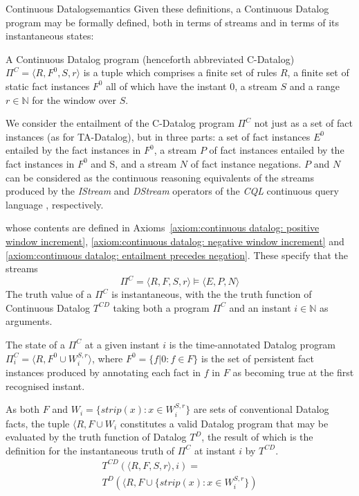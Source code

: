 \begin{nestedsection}{Continuous Datalog}{semantics}
Given these definitions, a Continuous Datalog program may be formally
defined, both in terms of streams and in terms of its instantaneous
states:

\begin{definition}

A Continuous Datalog program (henceforth abbreviated C-Datalog)
$\Pi^C = \langle R, F^0, S, r \rangle$ is a tuple which comprises a
finite set of rules $R$, a finite set of static fact instances $F^0$
all of which have the instant $0$, a stream $S$ and a range ${r \in
\mathbb{N}}$ for the window over $S$.


We consider the entailment of the C-Datalog program $\Pi^C$ not just
as a set of fact instances (as for TA-Datalog), but in three parts: a
set of fact instances $E^0$ entailed by the fact instances in $F^0$, a
stream $P$ of fact instances entailed by the fact instances in $F^0$
and S, and a stream $N$ of fact instance negations. $P$ and $N$ can be
considered as the continuous reasoning equivalents of the streams
produced by the \emph{IStream} and \emph{DStream} operators of the
\emph{CQL} continuous query language \citep{CQL}, respectively.



whose contents
are defined in 
Axioms~\ref{axiom:continuous datalog: positive window increment}, 
\ref{axiom:continuous datalog: negative window increment} and
\ref{axiom:continuous datalog: entailment precedes negation}. 
These specify that the streams 
\[ \Pi^C = \langle R, F, S, r \rangle \vDash \langle E, P, N \rangle \]
The truth value of a $\Pi^C$ is instantaneous, with the the truth
function of Continuous Datalog $T^{CD}$ taking both a program ${\Pi^C}$
and an instant ${i \in \mathbb{N}}$ as arguments.
\end{definition}

\begin{definition}[State of a $\Pi^C$]\label{def:continuous datalog: CDPt}
The state of a $\Pi^C$ at a given instant $i$ is the time-annotated
Datalog program ${\Pi^C_i = \langle R, F^0 \cup W^{S,r}_{i} \rangle}$,
where ${F^0 = \{ f | 0 : f \in F \}}$ is the set of persistent fact instances produced by
annotating each fact in $f$ in $F$ as becoming true at the first recognised instant.

As both $F$ and ${W_i = \{ strip(x) : x \in W^{S,r}_{i} \}}$ are sets of conventional
Datalog facts, the tuple ${\langle R, F \cup W_i}$
constitutes a valid Datalog program that may be evaluated by the truth
function of Datalog $T^{D}$, the result of which is the definition for the
instantaneous truth of $\Pi^C$ at instant $i$ by $T^{CD}$.
\begin{multline*}
T^{CD} \left( \langle R, F, S, r \rangle, i \right) = \\
	T^{D} \left( \langle R, F \cup \{ strip(x) : x \in W^{S,r}_{i} \} \right)
\end{multline*}


\end{definition}
\end{nestedsection}
